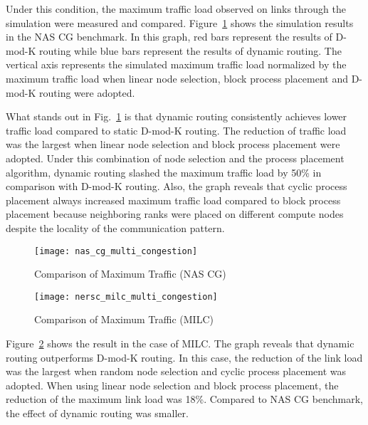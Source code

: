 Under this condition, the maximum traffic load observed on links through the
simulation were measured and compared.
Figure~\ref{fig:nas-cg-multi-congestion} shows the simulation results in
the NAS CG benchmark. In this graph, red bars represent the results of
\mbox{D-mod-K} routing while blue bars represent the results of dynamic
routing. The vertical axis represents the simulated maximum traffic load
normalized by the maximum traffic load when linear node selection, block
process placement and \mbox{D-mod-K} routing were adopted.

What stands out in Fig.~\ref{fig:nas-cg-multi-congestion} is that
dynamic routing consistently achieves lower traffic load compared to
static \mbox{D-mod-K} routing. The reduction of traffic load was the largest
when linear node selection and block process placement were adopted. Under
this combination of node selection and the process placement algorithm,
dynamic routing slashed the maximum traffic load by 50\% in comparison with
\mbox{D-mod-K} routing. Also, the graph reveals that cyclic process
placement always increased maximum traffic load compared to block process
placement because neighboring ranks were placed on different compute nodes
despite the locality of the communication pattern.

\begin{figure}
    \centering
    \texttt{[image: nas\_cg\_multi\_congestion]}
    \caption{Comparison of Maximum Traffic (NAS CG)}%
    \label{fig:nas-cg-multi-congestion}
\end{figure}

\begin{figure}
    \centering
    \texttt{[image: nersc\_milc\_multi\_congestion]}
    \caption{Comparison of Maximum Traffic (MILC)}%
    \label{fig:nersc-milc-multi-congestion}
\end{figure}

Figure~\ref{fig:nersc-milc-multi-congestion} shows the result in the case of
MILC\@. The graph reveals that dynamic routing outperforms \mbox{D-mod-K}
routing. In this case, the reduction of the link load was the largest when
random node selection and cyclic process placement was adopted. When using
linear node selection and block process placement, the reduction of the
maximum link load was 18\%. Compared to NAS CG benchmark, the effect of
dynamic routing was smaller.

